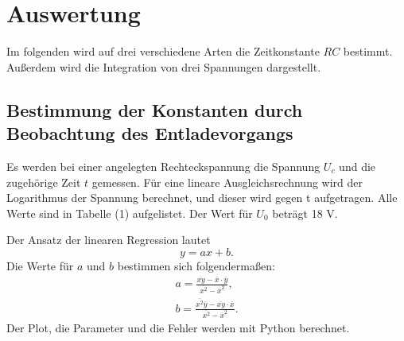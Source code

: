 \section{Auswertung}
\label{sec:Auswertung}

Im folgenden wird auf drei verschiedene Arten die Zeitkonstante $RC$ bestimmt. 
Außerdem wird die Integration von drei Spannungen dargestellt.

\subsection{Bestimmung der Konstanten durch Beobachtung des Entladevorgangs}
Es werden bei einer angelegten Rechteckspannung die Spannung $U_c$ und die zugehörige Zeit $t$ gemessen.
Für eine lineare Ausgleichsrechnung wird der Logarithmus der Spannung berechnet, und dieser wird gegen t aufgetragen.
Alle Werte sind in Tabelle (1) aufgelistet. Der Wert für $U_0$ beträgt 18 V.

\noindent Der Ansatz der linearen Regression lautet
\begin{equation}
    y = ax+b .
\end{equation}
Die Werte für $a$ und $b$ bestimmen sich folgendermaßen:
\begin{align}
a = \frac{\overline{xy}-\overline{x}\cdot\overline{y}}{\overline{x^2}-\overline{x}^2}, \\
  b = \frac{\overline{x^2}\overline{y}-\overline{xy}\cdot\overline{x}}{\overline{x^2}-\overline{x}^2} .
\end{align}
Der Plot, die Parameter und die Fehler werden mit Python berechnet.


